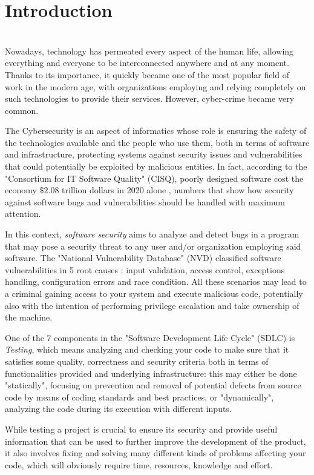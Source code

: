 \chapter{Introduction}
\ \\
Nowadays, technology has permeated every aspect of the human life, allowing everything and everyone to be interconnected anywhere and at any moment. Thanks to its importance, it quickly became one of the most popular field of work in the modern age, with organizations employing and relying completely on such technologies to provide their services. However, cyber-crime became very common. 

The Cybersecurity is an aspect of informatics whose role is ensuring the safety of the technologies available and the people who use them, both in terms of software and infrastructure, protecting systems against security issues and vulnerabilities that could potentially be exploited by malicious entities. In fact, according to the "Consortium for IT Software Quality" (CISQ), poorly designed software cost the economy $\$2.08$ trillion dollars in 2020 alone \cite{forbes}, numbers that show how security against software bugs and vulnerabilities should be handled with maximum attention.

In this context, \textit{software security} aims to analyze and detect bugs in a program that may pose a security threat to any user and/or organization employing said software. The "National Vulnerability Database" (NVD) classified software vulnerabilities in 5 root causes \cite{nist}: input validation, access control, exceptions handling, configuration errors and race condition. All these scenarios may lead to a criminal gaining access to your system and execute malicious code, potentially also with the intention of performing privilege escalation and take ownership of the machine. 

One of the 7 components in the "Software Development Life Cycle" (SDLC) is \textit{Testing}, which means analyzing and checking your code to make sure that it satisfies some quality, correctness and security criteria both in terms of functionalities provided and underlying infrastructure: this may either be done "statically", focusing on prevention and removal of potential defects from source code by means of coding standards and best practices, or "dynamically", analyzing the code during its execution with different inputs.

While testing a project is crucial to ensure its security and provide useful information that can be used to further improve the development of the product, it also involves fixing and solving many different kinds of problems affecting your code, which will obviously require time, resources, knowledge and effort.   






